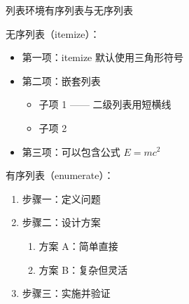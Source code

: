 \documentclass[UTF8,11pt,aspectratio=169]{beamer}
\begin{document}
\begin{frame}{列表环境}{有序列表与无序列表}

    无序列表（itemize）：
    \begin{itemize}
        \item 第一项：itemize 默认使用三角形符号
        \item 第二项：嵌套列表
        \begin{itemize}
            \item 子项 1 —— 二级列表用短横线
            \item 子项 2
        \end{itemize}
        \item 第三项：可以包含公式 $E = mc^2$
    \end{itemize}

    有序列表（enumerate）：
    \begin{enumerate}
        \item 步骤一：定义问题
        \item 步骤二：设计方案
        \begin{enumerate}
            \item 方案 A：简单直接
            \item 方案 B：复杂但灵活
        \end{enumerate}
        \item 步骤三：实施并验证
    \end{enumerate}
\end{frame}
\end{document}
